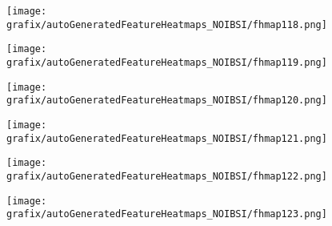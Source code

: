 \begin{subfigure}{\wid\textwidth} 
    \centering 
    \caption{\small \sffamily {}} 
\end{subfigure} 
\hspace{\hsp} 
\begin{subfigure}{\wid\textwidth} 
    \centering 
    \caption{\tiny \sffamily {}} 
    \vspace{\vsp} 
    \texttt{[image: grafix/autoGeneratedFeatureHeatmaps\_NOIBSI/fhmap118.png]} 
\end{subfigure} 
\hspace{\hsp} 
\begin{subfigure}{\wid\textwidth} 
    \centering 
    \caption{\tiny \sffamily {}} 
    \vspace{\vsp} 
    \texttt{[image: grafix/autoGeneratedFeatureHeatmaps\_NOIBSI/fhmap119.png]} 
\end{subfigure} 
\hspace{\hsp} 
\begin{subfigure}{\wid\textwidth} 
    \centering 
    \caption{\tiny \sffamily {}} 
    \vspace{\vsp} 
    \texttt{[image: grafix/autoGeneratedFeatureHeatmaps\_NOIBSI/fhmap120.png]} 
\end{subfigure} 
\hspace{\hsp} 
\begin{subfigure}{\wid\textwidth} 
    \centering 
    \caption{\tiny \sffamily {}} 
    \vspace{\vsp} 
    \texttt{[image: grafix/autoGeneratedFeatureHeatmaps\_NOIBSI/fhmap121.png]} 
\end{subfigure} 
\hspace{\hsp} 
\begin{subfigure}{\wid\textwidth} 
    \centering 
    \caption{\tiny \sffamily {}} 
    \vspace{\vsp} 
    \texttt{[image: grafix/autoGeneratedFeatureHeatmaps\_NOIBSI/fhmap122.png]} 
\end{subfigure} 
\hspace{\hsp} 
\begin{subfigure}{\wid\textwidth} 
    \centering 
    \caption{\tiny \sffamily {}} 
    \vspace{\vsp} 
    \texttt{[image: grafix/autoGeneratedFeatureHeatmaps\_NOIBSI/fhmap123.png]} 
\end{subfigure} 
